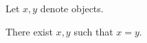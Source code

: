 \begin{forthel}
    Let $x, y$ denote objects.

    \begin{lemma}
        There exist $x, y$ such that $x = y$.
    \end{lemma}
\end{forthel}
